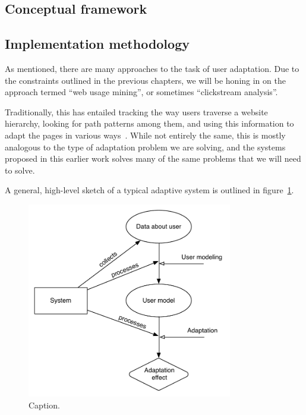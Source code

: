 \subsection{Conceptual framework}

\subsection{Implementation methodology}

As mentioned, there are many approaches to the task of user adaptation. Due to the constraints outlined in the previous chapters, we will be honing in on the approach termed ``web usage mining'', or sometimes ``clickstream analysis''.

Traditionally, this has entailed tracking the way users traverse a website hierarchy, looking for path patterns among them, and using this information to adapt the pages in various ways~\cite{Mobasher2000,Eirinaki2003,Montgomery2009}. While not entirely the same, this is mostly analogous to the type of adaptation problem we are solving, and the systems proposed in this earlier work solves many of the same problems that we will need to solve.

A general, high-level sketch of a typical adaptive system is outlined in figure~\ref{fig:general_adaptive_system}.

\begin{figure}[h]
  \centering
    \includegraphics[width=0.8\textwidth]{Figures/adaptation-high-level}
  \caption{Caption.}
  \label{fig:general_adaptive_system}
\end{figure}

